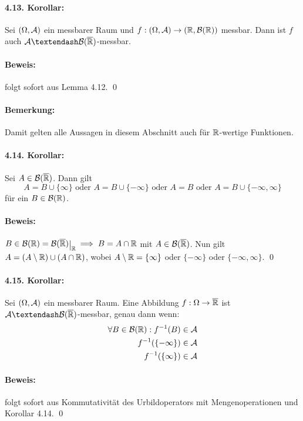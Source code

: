 \documentclass[12pt]{report}
\begin{document}
 \paragraph{4.13. Korollar:}Sei $(\Omega,\mathcal{A})$ ein messbarer Raum und $f:(\Omega,\mathcal{A})\to(\mathbb{R},\mathcal{B}(\mathbb{R}))$ messbar. Dann ist $f$ auch $\A\textendash\cB(\overline\R)$-messbar.
 
 \paragraph{Beweis:}folgt sofort aus Lemma 4.12. \qed
 
 \paragraph{Bemerkung:}Damit gelten alle Aussagen in diesem Abschnitt auch f\"ur $\mathbb{R}$-wertige Funktionen.
 
 \paragraph{4.14. Korollar:}Sei $A\in\mathcal{B}(\overline{\mathbb{R}})$. Dann gilt
 $$A=B\cup\{\infty\} \text{ oder } A=B\cup\{-\infty\} \text{ oder } A=B \text{ oder } A=B\cup\{-\infty,\infty\}$$
 f\"ur ein $B\in\mathcal{B}(\mathbb{R})$.
 
 \paragraph{Beweis:}$B\in\borel=\cB(\overline\R)\krestr{\R}\implies B=A\cap\R$ mit $A\in\mathcal{B}(\overline{\mathbb{R}})$. Nun gilt $A=(A\setminus\mathbb{R})\cup(A\cap\mathbb{R})$, wobei $A\setminus\mathbb{R}=\{\infty\}$ oder $\{-\infty\}$ oder $\{-\infty,\infty\}$. \qed
 
 \paragraph{4.15. Korollar:}Sei $(\Omega,\mathcal{A})$ ein messbarer Raum. Eine Abbildung $f:\Omega\to\overline{\mathbb{R}}$ ist $\A\textendash\cB(\overline\R)$-messbar, genau dann wenn:
 \begin{align*}
     \forall B\in\mathcal{B}(\mathbb{R}):f^{-1}(B)&\in\mathcal{A}\\
     f^{-1}(\{-\infty\})&\in\mathcal{A}\\
     f^{-1}(\{\infty\})&\in\mathcal{A}
 \end{align*}
 
 \paragraph{Beweis:}folgt sofort aus Kommutativit\"at des Urbildoperators mit Mengenoperationen und Korollar 4.14. \qed
 
\end{document}
